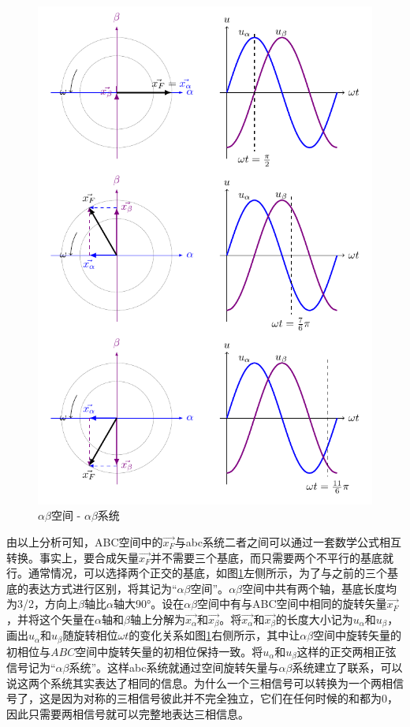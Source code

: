 \documentclass{ctexart}
\numberwithin{equation}{section}
\begin{document}
\begin{figure}[hbtp]
\begin{minipage}[b]{0.48\linewidth}
\includegraphics[width = \linewidth]{alpha-beta-space.pdf}
\caption{$\alpha \beta $空间 - $\alpha \beta $系统}
\label{alpha-beta-space}
\end{minipage}
\end{figure}

由以上分析可知，ABC空间中的$ \vec{x_F} $与abc系统二者之间可以通过一套数学公式相互转换。事实上，要合成矢量$ \vec{x_F} $并不需要三个基底，而只需要两个不平行的基底就行。通常情况，可以选择两个正交的基底，如图\ref{alpha-beta-space}左侧所示，为了与之前的三个基底的表达方式进行区别，将其记为“$\alpha \beta$空间”。$\alpha \beta$空间中共有两个轴，基底长度均为3/2，方向上$ \beta $轴比$ \alpha $轴大\ang{90}。设在$\alpha \beta$空间中有与ABC空间中相同的旋转矢量$ \vec{x_F} $，并将这个矢量在$ \alpha $轴和$ \beta $轴上分解为$\vec{x_{\alpha}}$和$\vec{x_{\beta}}$。将$\vec{x_{\alpha}}$和$\vec{x_{\beta}}$的长度大小记为${u_{\alpha}}$和${u_{\beta}}$，画出${u_{\alpha}}$和${u_{\beta}}$随旋转相位$\omega t$的变化关系如图\ref{alpha-beta-space}右侧所示，其中让$\alpha \beta$空间中旋转矢量的初相位与$ABC$空间中旋转矢量的初相位保持一致。将${u_{\alpha}}$和${u_{\beta}}$这样的正交两相正弦信号记为“$\alpha \beta$系统”。这样abc系统就通过空间旋转矢量与$\alpha \beta$系统建立了联系，可以说这两个系统其实表达了相同的信息。为什么一个三相信号可以转换为一个两相信号了，这是因为对称的三相信号彼此并不完全独立，它们在任何时候的和都为0，因此只需要两相信号就可以完整地表达三相信息。
\end{document}
